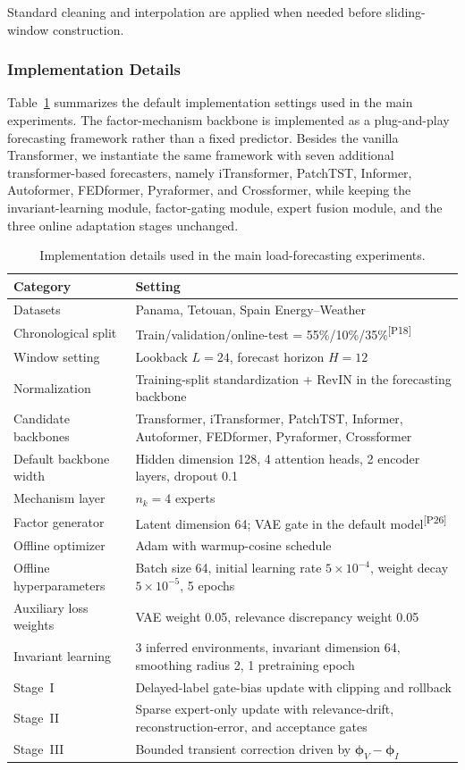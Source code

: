 ﻿\documentclass[journal]{IEEEtran}
\DeclareRobustCommand{\auditbad}[2]{{\color{auditred}#1}{\color{auditred}\textsuperscript{[#2]}}}
\begin{document}
Standard cleaning and interpolation are applied when needed before sliding-window construction.

\subsubsection{Implementation Details}
Table~\ref{tab:impl_details} summarizes the default implementation settings used in the main experiments. The factor-mechanism backbone is implemented as a plug-and-play forecasting framework rather than a fixed predictor. Besides the vanilla Transformer, we instantiate the same framework with seven additional transformer-based forecasters, namely iTransformer, PatchTST, Informer, Autoformer, FEDformer, Pyraformer, and Crossformer, while keeping the invariant-learning module, factor-gating module, expert fusion module, and the three online adaptation stages unchanged.

\begin{table}[t]
\caption{Implementation details used in the main load-forecasting experiments.}
\label{tab:impl_details}
\centering
\begin{tabular}{ll}
\toprule
Category & Setting \\
\midrule
Datasets & Panama, Tetouan, Spain Energy--Weather \\
Chronological split & \auditbad{Train/validation/online-test = 55\%/10\%/35\%}{P18} \\
Window setting & Lookback $L=24$, forecast horizon $H=12$ \\
Normalization & Training-split standardization + RevIN in the forecasting backbone \\
Candidate backbones & Transformer, iTransformer, PatchTST, Informer, Autoformer, FEDformer, Pyraformer, Crossformer \\
Default backbone width & Hidden dimension 128, 4 attention heads, 2 encoder layers, dropout 0.1 \\
Mechanism layer & $n_k=4$ experts \\
Factor generator & Latent dimension 64; \auditbad{VAE gate in the default model}{P26} \\
Offline optimizer & Adam with warmup-cosine schedule \\
Offline hyperparameters & Batch size 64, initial learning rate $5\times 10^{-4}$, weight decay $5\times 10^{-5}$, 5 epochs \\
Auxiliary loss weights & VAE weight 0.05, relevance discrepancy weight 0.05 \\
Invariant learning & 3 inferred environments, invariant dimension 64, smoothing radius 2, 1 pretraining epoch \\
Stage~I & Delayed-label gate-bias update with clipping and rollback \\
Stage~II & Sparse expert-only update with relevance-drift, reconstruction-error, and acceptance gates \\
Stage~III & Bounded transient correction driven by $\boldsymbol{\phi}_V-\boldsymbol{\phi}_I$ \\
\bottomrule
\end{tabular}
\end{table}
\end{document}
